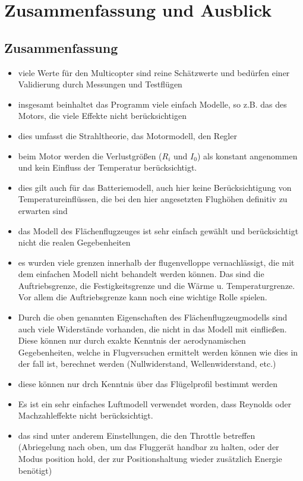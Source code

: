 \chapter{Zusammenfassung und Ausblick}

\section{Zusammenfassung}
\begin{itemize}
	\item viele Werte für den Multicopter sind reine Schätzwerte und bedürfen einer Validierung durch Messungen und Testflügen
	\item insgesamt beinhaltet das Programm viele einfach Modelle, so z.B. das des Motors, die viele Effekte nicht berücksichtigen
	\item dies umfasst die Strahltheorie, das Motormodell, den Regler
	\item beim Motor werden die Verlustgrößen (\ensuremath{R_i} und \ensuremath{I_0}) als konstant angenommen und kein Einfluss der Temperatur berücksichtigt.
	\item dies gilt auch für das Batteriemodell, auch hier keine Berücksichtigung von Temperatureinflüssen, die bei den hier angesetzten Flughöhen definitiv zu erwarten sind 
	\item das Modell des Flächenflugzeuges ist sehr einfach gewählt und berücksichtigt nicht die realen Gegebenheiten
	\item es wurden viele grenzen innerhalb der flugenvelloppe vernachlässigt, die mit dem einfachen Modell nicht behandelt werden können. Das sind die Auftriebsgrenze, die Festigkeitsgrenze und die Wärme u. Temperaturgrenze. Vor allem die Auftriebsgrenze kann noch eine wichtige Rolle spielen. 
	\item Durch die oben genannten Eigenschaften des Flächenflugzeugmodells sind auch viele Widerstände vorhanden, die nicht in das Modell mit einfließen. Diese können nur durch exakte Kenntnis der aerodynamischen Gegebenheiten, welche in Flugversuchen ermittelt werden können wie dies in \cite{Ostler.2006} der fall ist, berechnet werden (Nullwiderstand, Wellenwiderstand, etc.)
	\item diese können nur drch Kenntnis über das Flügelprofil bestimmt werden
	\item Es ist ein sehr einfaches Luftmodell verwendet worden, dass Reynolds oder Machzahleffekte nicht berücksichtigt. 
	\item das sind unter anderem Einstellungen, die den Throttle betreffen (Abriegelung nach oben, um das Fluggerät handbar zu halten, oder der Modus position hold, der zur Positionshaltung wieder zusätzlich Energie benötigt)

\end{itemize}
